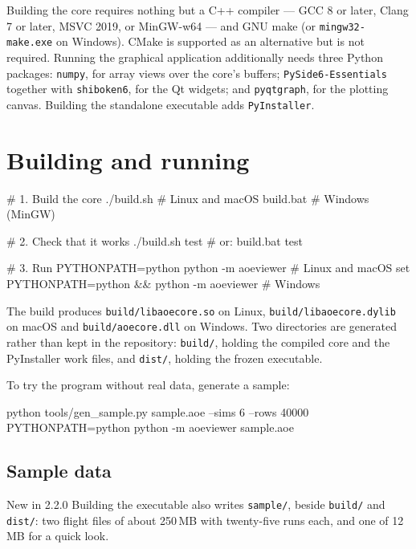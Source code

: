 \documentclass[11pt,a4paper,oneside]{report}
\newcommand{\appver}{2.2.0}
\newcommand{\code}[1]{\texttt{#1}}
\begin{document}
Building the core requires nothing but a C++ compiler --- GCC 8 or later, Clang
7 or later, MSVC 2019, or MinGW-w64 --- and GNU make (or
\code{mingw32-make.exe} on Windows). CMake is supported as an alternative but
is not required. Running the graphical application additionally needs three
Python packages: \code{numpy}, for array views over the core's buffers;
\code{PySide6-Essentials} together with \code{shiboken6}, for the Qt widgets;
and \code{pyqtgraph}, for the plotting canvas. Building the standalone
executable adds \code{PyInstaller}.

\section{Building and running}

\begin{aoecode}
# 1. Build the core
./build.sh                  # Linux and macOS
build.bat                   # Windows (MinGW)

# 2. Check that it works
./build.sh test             # or: build.bat test

# 3. Run
PYTHONPATH=python python -m aoeviewer                # Linux and macOS
set PYTHONPATH=python && python -m aoeviewer         # Windows
\end{aoecode}

The build produces \code{build/libaoecore.so} on Linux,
\code{build/libaoecore.dylib} on macOS and \code{build/aoecore.dll} on
Windows. Two directories are generated rather than kept in the repository:
\code{build/}, holding the compiled core and the PyInstaller work files, and
\code{dist/}, holding the frozen executable.

To try the program without real data, generate a sample:

\begin{aoecode}
python tools/gen_sample.py sample.aoe --sims 6 --rows 40000
PYTHONPATH=python python -m aoeviewer sample.aoe
\end{aoecode}

\subsection{Sample data}
\label{sec:samples}

\begin{aoenew}{New in \appver}
Building the executable also writes \code{sample/}, beside \code{build/} and
\code{dist/}: two flight files of about 250\,MB with twenty-five runs each, and
one of 12\,MB for a quick look.
\end{aoenew}
\end{document}
